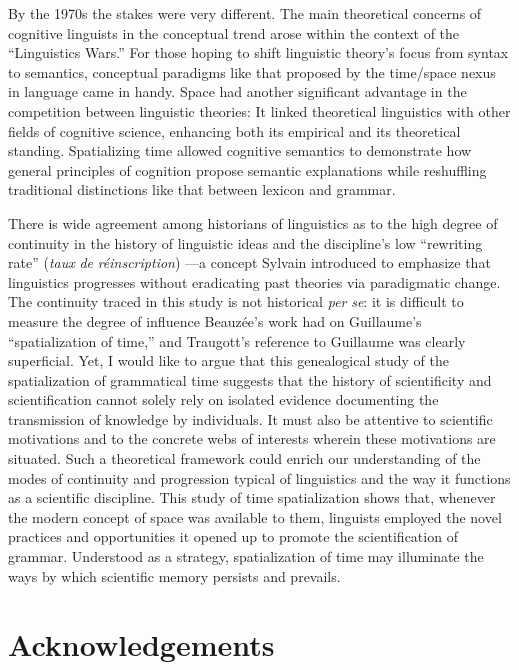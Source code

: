 \documentclass[output=paper]{langsci/langscibook}
\begin{document}
By the 1970s the stakes were very different. The main theoretical concerns of cognitive linguists in the conceptual trend arose within the context of the “Linguistics Wars.” For those hoping to shift linguistic theory’s focus from syntax to semantics, conceptual paradigms like that proposed by the time/space nexus in language came in handy. Space had another significant advantage in the competition between linguistic theories: It linked theoretical linguistics with other fields of cognitive science, enhancing both its empirical and its theoretical standing. Spatializing time allowed cognitive semantics to demonstrate how general principles of cognition propose semantic explanations while reshuffling traditional distinctions like that between lexicon and grammar. 

There is wide agreement among historians of linguistics as to the high degree of continuity in the history of linguistic ideas and the discipline’s low “rewriting rate” (\textit{taux} \textit{de} \textit{réinscription}) —a concept Sylvain \citet{auroux_histoire_1980} introduced to emphasize that linguistics progresses without eradicating past theories via paradigmatic change. The continuity traced in this study is not historical \textit{per} \textit{se}: it is difficult to measure the degree of influence Beauzée’s work had on Guillaume’s “spatialization of time,” and Traugott’s reference to Guillaume was clearly superficial. Yet, I would like to argue that this genealogical study of the spatialization of grammatical time suggests that the history of scientificity \citep{auroux_techne_1990} and scientification cannot solely rely on isolated evidence documenting the transmission of knowledge by individuals. It must also be attentive to scientific motivations and to the concrete webs of interests wherein these motivations are situated. Such a theoretical framework could enrich our understanding of the modes of continuity and progression typical of linguistics and the way it functions as a scientific discipline. This study of time spatialization shows that, whenever the modern concept of space was available to them, linguists employed the novel practices and opportunities it opened up to promote the scientification of grammar. Understood as a strategy, spatialization of time may illuminate the ways by which scientific memory persists and prevails.

\section*{Acknowledgements}

{\sloppy\printbibliography[heading=subbibliography,notkeyword=this]}
\end{document}
